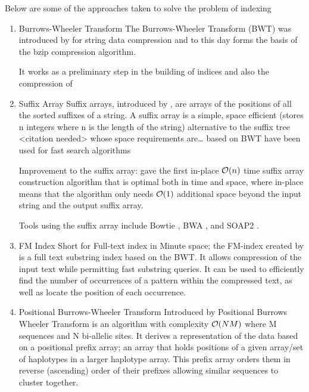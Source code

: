 \documentclass[11pt]{article}
\begin{document}
Below are some of the approaches taken to solve the problem of indexing
\begin{enumerate}
\item Burrows-Wheeler Transform
\label{sec:org7846cec}
The Burrows-Wheeler Transform (BWT) was introduced by
\cite{burrowsBlocksortingLosslessData1994} for string data 
compression and to this day forms the basis of the bzip compression algorithm.

It works as a preliminary step in the building of indices and also the 
compression of 

\item Suffix Array
\label{sec:orgd337695}
Suffix arrays, introduced by \cite{manberSuffixArraysNew1990}, are arrays of the
positions of all the sorted suffixes of a string.
A suffix array is a simple, space efficient
(stores n integers where n is the length of the string) alternative to the
suffix tree <citation needed> whose space requirements are\ldots{}
based on BWT have been used for fast search algorithms

Improvement to the suffix array: \cite{liMinimapMiniasmFast2016}
gave the first in-place \(\mathcal{O}(n)\) time suffix array construction algorithm that
is optimal both in time and space, where in-place means that the algorithm only
needs \(\mathcal{O}(1)\) additional space beyond the input string and the output suffix
array.

Tools using the suffix array include Bowtie
\cite{langmeadUltrafastMemoryefficientAlignment2009}, BWA
\cite{liFastAccurateShort2009}, 
and SOAP2 \cite{liSOAP2ImprovedUltrafast2009}.

\item FM Index
\label{sec:org9b4491f}
Short for Full-text index in Minute space; the FM-index created
by \cite{ferraginaOpportunisticDataStructures2000} is a full text substring index
based on the BWT. It allows compression of the input text while permitting fast
substring queries. It can be used to efficiently find the number of occurrences
of a pattern within the compressed text, as well as locate the position of each
occurrence.

\item Positional Burrows-Wheeler Transform
\label{sec:org20bb36b}
Introduced by \cite{durbinEfficientHaplotypeMatching2014} Positional Burrows 
Wheeler Transform is an algorithm with complexity \(\mathcal{O}(NM)\) where M sequences
and N bi-allelic sites.
It derives a representation of the data based on a positional prefix array; an
array that holds positions of a given array/set of haplotypes in a larger 
haplotype array. This prefix array orders them in reverse (ascending) order of
their prefixes allowing similar sequences to cluster together.


\end{enumerate}
\end{document}
